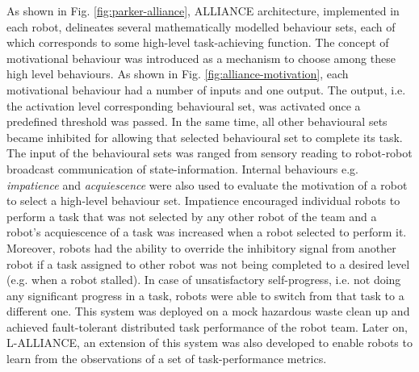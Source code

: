 As shown in Fig. \ref{fig:parker-alliance}, ALLIANCE architecture, implemented in each robot, delineates several mathematically modelled behaviour sets, each of which corresponds to some high-level task-achieving function. The concept of motivational behaviour was introduced  as a mechanism to choose among these high level behaviours. As shown in Fig. \ref{fig:alliance-motivation}, each motivational behaviour had a number of inputs and one output. The output, i.e. the activation level corresponding behavioural set, was activated once a predefined threshold was passed. In the same time, all other behavioural sets became inhibited for allowing that selected behavioural set to complete its task. The input of the behavioural sets was ranged from sensory reading to robot-robot broadcast communication of state-information. Internal behaviours e.g. {\em impatience}  and {\em acquiescence} were also used to evaluate the motivation of a robot to select a high-level behaviour set.  Impatience encouraged individual robots to perform a task that was not selected by any other robot of the team and a robot's acquiescence of a task was increased when a robot selected to perform it.  Moreover, robots had the ability to override the inhibitory signal from another robot if a task assigned to other robot was not being completed to a desired level (e.g. when a robot stalled). In case of unsatisfactory self-progress, i.e. not doing any significant progress in a task, robots were able to switch from that task to a different one. This system was deployed on a mock hazardous waste clean up and achieved fault-tolerant distributed task performance of the robot team. Later on, L-ALLIANCE, an extension of this system was also developed to enable robots  to learn from the observations of a set of task-performance metrics. \\

